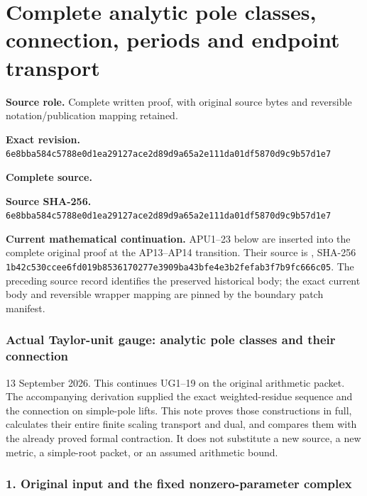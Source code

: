 \begingroup

\section{Complete analytic pole classes, connection, periods and endpoint transport}


\begingroup
\sloppy
\small

\noindent\textbf{Source role.} Complete written proof, with original source bytes and reversible notation/publication mapping retained.\par
\noindent\textbf{Exact revision.} \nolinkurl{6e8bba584c5788e0d1ea29127ace2d89d9a65a2e111da01df5870d9c9b57d1e7}\par
\noindent\textbf{Complete source.} \par
\noindent\textbf{Source SHA-256.} \nolinkurl{6e8bba584c5788e0d1ea29127ace2d89d9a65a2e111da01df5870d9c9b57d1e7}\par\medskip
\noindent\textbf{Current mathematical continuation.} APU1--23 below are inserted into the complete original proof at the AP13--AP14 transition. Their source is , SHA-256 \nolinkurl{1b42c530ccee6fd019b8536170277e3909ba43bfe4e3b2fefab3f7b9fc666c05}. The preceding source record identifies the preserved historical body; the exact current body and reversible wrapper mapping are pinned by the boundary patch manifest.\par\medskip
\subsubsection{Actual Taylor-unit gauge: analytic pole classes and their connection}\label{endpoint-analytic_pole--actual-taylor-unit-gauge-analytic-pole-classes-and-their-connection}

13 September 2026. This continues UG1--19 on the original arithmetic packet. The accompanying derivation supplied the exact weighted-residue sequence and the connection on simple-pole lifts. This note proves those constructions in full, calculates their entire finite scaling transport and dual, and compares them with the already proved formal contraction. It does not substitute a new source, a new metric, a simple-root packet, or an assumed arithmetic bound.

\subsubsection{1. Original input and the fixed nonzero-parameter complex}\label{endpoint-analytic_pole--original-input-and-the-fixed-nonzero-parameter-complex}

